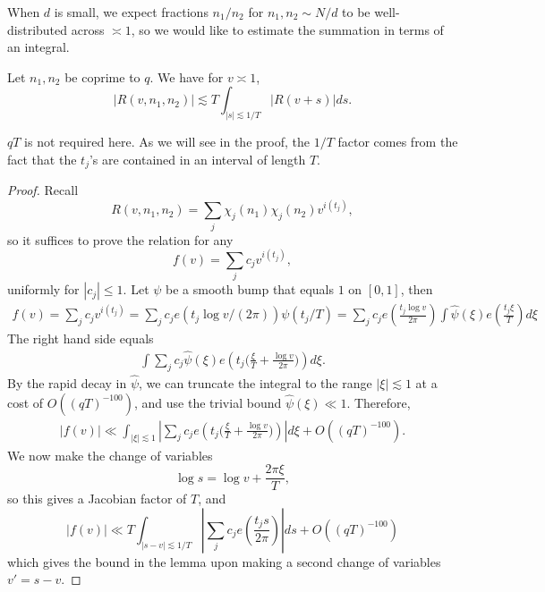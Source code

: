 When $d$ is small, we expect fractions $n_1/n_2$ for $n_1,n_2\sim N/d$ to be well-distributed across $\asymp 1$, so we would like to estimate the summation in terms of an integral. 
\begin{lemma}
    Let $n_1,n_2$ be coprime to $q$. We have for $v\asymp 1$,
    \[
    |R(v,n_1,n_2)|\lesssim T\int_{|s|\lesssim 1/T} |R(v+s)|ds.
    \]
\end{lemma}
\begin{remark}
	$qT$ is not required here. As we will see in the proof, the $1/T$ factor comes from the fact that the $t_j$'s are contained in an interval of length $T$.
\end{remark}
\begin{proof}
    Recall \[
    R(v,n_1,n_2)=\sum_j \chi_j(n_1)\chi_j(n_2)v^{i(t_j)},
    \]
    so it suffices to prove the relation for any \[
    f(v) = \sum_j c_j v^{i(t_j)},
    \]
    uniformly for $|c_j|\leq 1$. Let $\psi$ be a smooth bump that equals $1$ on $[0,1]$, then \begin{align*}
        f(v) = \sum_j c_j v^{i(t_j)} = \sum_j c_j e(t_j\log v/(2\pi))\psi(t_j/T) =  \sum_j c_j e\left(\frac{t_j\log v}{2\pi}\right)\int \hat\psi(\xi)e\left(\frac{t_j\xi}{T}\right)d\xi
    \end{align*}
    The right hand side equals \begin{align*}
        \int \sum_j c_j  \hat\psi(\xi)e\left(t_j\Big(\frac{\xi}{T} +\frac{\log v}{2\pi}\Big)\right)d\xi.
    \end{align*}
    By the rapid decay in $\hat\psi$, we can truncate the integral to the range $|\xi|\lesssim 1$ at a cost of $O((qT)^{-100})$, and use the trivial bound $\hat\psi(\xi)\ll 1$.
    Therefore, \begin{align*}
        |f(v)|\ll \int_{|\xi|\lesssim 1}\left| \sum_j c_j  e\left(t_j\Big(\frac{\xi}{T} +\frac{\log v}{2\pi}\Big)\right)\right|d\xi +O((qT)^{-100}).
    \end{align*}
    We now make the change of variables \[
    \log s= \log v + \frac{2\pi\xi}{T},
    \]
    so this gives a Jacobian factor of $T$, and \[
        |f(v)|\ll T \int_{|s-v|\lesssim 1/T}\left| \sum_j c_j  e\left(\frac{t_js}{2\pi}\right)\right|ds +O((qT)^{-100})\]
        which gives the bound in the lemma upon making a second change of variables $v'=s-v$.
\end{proof}

